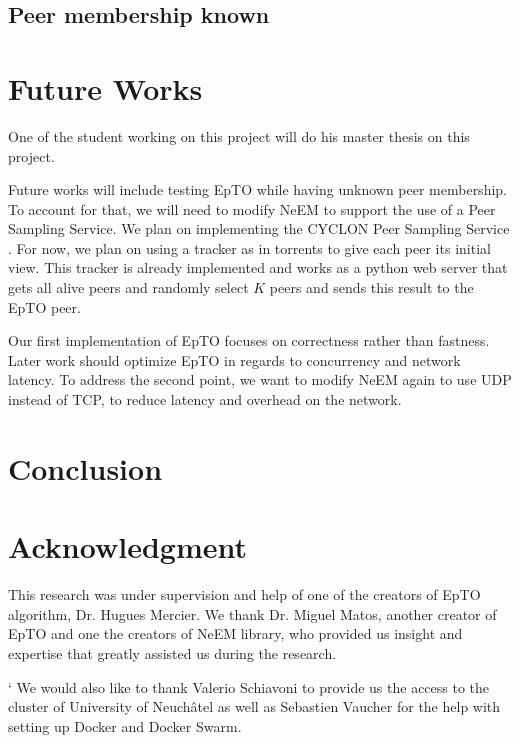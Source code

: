 \documentclass[10pt,conference,a4paper]{IEEEtran}
\begin{document}
\subsection{Peer membership known}

\section{Future Works}
One of the student working on this project will do his master thesis on this project.

Future works will include testing EpTO while having unknown peer membership. To account for that, we will need to modify NeEM to support the use of a Peer Sampling Service. We plan on implementing the CYCLON Peer Sampling Service \autocite{Voulgaris2005}. For now, we plan on using a tracker as in torrents to give each peer its initial view. This tracker is already implemented and works as a python web server that gets all alive peers and randomly select $K$ peers and sends this result to the EpTO peer.

Our first implementation of EpTO focuses on correctness rather than fastness. Later work should optimize EpTO in regards to concurrency and network latency. To address the second point, we want to modify NeEM again to use UDP instead of TCP, to reduce latency and overhead on the network.
\section{Conclusion}




\section*{Acknowledgment}
This research was under supervision and help of one of the creators of EpTO algorithm, Dr. Hugues Mercier. We 	thank Dr. Miguel Matos, another creator of EpTO and one the creators of NeEM library, who provided us insight and expertise that greatly assisted us during the research.
\par`
We would also like to thank Valerio Schiavoni to provide us the access to the cluster of University of Neuchâtel as well as Sebastien Vaucher for the help with setting up Docker and Docker Swarm.




\begin{otherlanguage}{australian}
\printbibliography
\end{otherlanguage}

\end{document}
